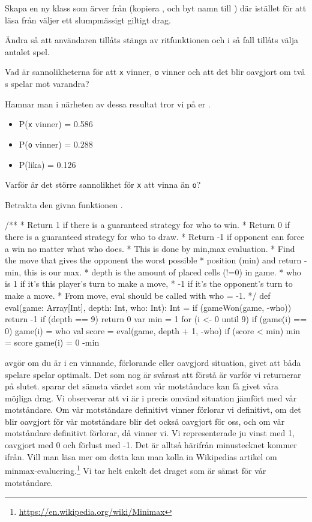 \Subtask Skapa en ny klass som ärver från  (kopiera , och byt namn till ) där  istället för att läsa från  väljer ett slumpmässigt giltigt drag.

\Subtask Ändra  så att användaren tillåts stänga av ritfunktionen och i så fall tillåts välja antalet spel.

\Subtask Vad är sannolikheterna för att \texttt{x} vinner, \texttt{o} vinner och att det blir oavgjort om två s spelar mot varandra?

Hamnar man i närheten av dessa resultat tror vi på er .
\begin{itemize}
	\item P(\texttt{x} vinner) = 0.586
	\item P(\texttt{o} vinner) = 0.288
	\item P(lika) = 0.126
\end{itemize}

\Subtask Varför är det större sannolikhet för \texttt{x} att vinna än \texttt{o}?

\Task {}

Betrakta den givna funktionen .
\begin{Code}
/**
 * Return 1 if there is a guaranteed strategy for who to win.
 * Return 0 if there is a guaranteed strategy for who to draw.
 * Return -1 if opponent can force a win no matter what who does.
 * This is done by min,max evaluation.
 * Find the move that gives the opponent the worst possible
 * position (min) and return -min, this is our max.
 * depth is the amount of placed cells (!=0) in game.
 * who is 1 if it's this player's turn to make a move,
 * -1 if it's the opponent's turn to make a move. 
 * From move, eval should be called with who = -1.
 */
def eval(game: Array[Int], depth: Int, who: Int): Int = {
	if (gameWon(game, -who)) return -1
	if (depth == 9) return 0
	var min = 1
	for (i <- 0 until 9) {
		if (game(i) == 0) {
			game(i) = who
			val score = eval(game, depth + 1, -who)
			if (score < min) {
				min = score
			}
			game(i) = 0
		}
	}
	-min
}
\end{Code}

 avgör om du är i en vinnande, förlorande eller oavgjord situation, givet att båda spelare spelar optimalt. Det som nog är svårast att förstå är varför vi returnerar  på slutet.  sparar det sämsta värdet som vår motståndare kan få givet våra möjliga drag. Vi observerar att vi är i precis omvänd situation jämfört med vår motståndare. Om vår motståndare definitivt vinner förlorar vi definitivt, om det blir oavgjort för vår motståndare blir det också oavgjort för oss, och om vår motståndare definitivt förlorar, då vinner vi. Vi representerade ju vinst med 1, oavgjort med 0 och förlust med -1. Det är alltså härifrån minustecknet kommer ifrån. Vill man läsa mer om detta kan man kolla in Wikipedias artikel om minmax-evaluering.\footnote{\url{https://en.wikipedia.org/wiki/Minimax}} Vi tar helt enkelt det draget som är sämst för vår motståndare.

